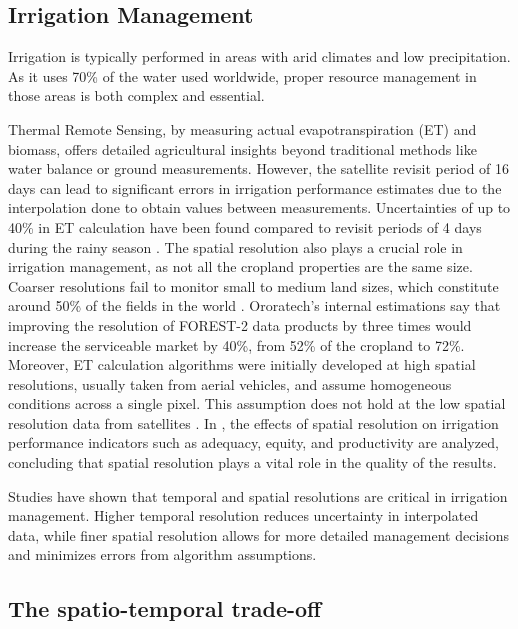     \subsection{Irrigation Management}

    Irrigation is typically performed in areas with arid climates and low precipitation. As it uses 70\% of the water used worldwide, proper resource management in those areas is both complex and essential.

    Thermal Remote Sensing, by measuring actual evapotranspiration (ET) and biomass, offers detailed agricultural insights beyond traditional methods like water balance or ground measurements. However, the satellite revisit period of 16 days can lead to significant errors in irrigation performance estimates due to the interpolation done to obtain values between measurements. Uncertainties of up to 40\% in ET calculation have been found compared to revisit periods of 4 days during the rainy season \cite{rs11050573}. 
    The spatial resolution also plays a crucial role in irrigation management, as not all the cropland properties are the same size. Coarser resolutions fail to monitor small to medium land sizes, which constitute around 50\% of the fields in the world \cite{Lesiv2018}. Ororatech's internal estimations say that improving the resolution of FOREST-2 data products by three times would increase the serviceable market by 40\%, from 52\% of the cropland to 72\%. 
    Moreover, ET calculation algorithms were initially developed at high spatial resolutions, usually taken from aerial vehicles, and assume homogeneous conditions across a single pixel. This assumption does not hold at the low spatial resolution data from satellites \cite{rs13081524}.
    In \cite{rs12182949}, the effects of spatial resolution on irrigation performance indicators such as adequacy, equity, and productivity are analyzed, concluding that spatial resolution plays a vital role in the quality of the results. 
    
    Studies have shown that temporal and spatial resolutions are critical in irrigation management. Higher temporal resolution reduces uncertainty in interpolated data, while finer spatial resolution allows for more detailed management decisions and minimizes errors from algorithm assumptions.


    \subsection{The spatio-temporal trade-off}

